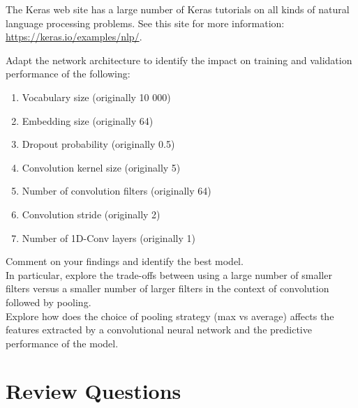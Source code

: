 \begin{resourcebox}
The Keras web site has a large number of Keras tutorials on all kinds of natural language processing problems. See this site for more information: \small\url{https://keras.io/examples/nlp/}\normalsize.
\end{resourcebox}


\begin{exercisebox}

Adapt the network architecture to identify the impact on training and validation performance of the following:
   \begin{enumerate}
      \item Vocabulary size (originally 10 000)
      \item Embedding size (originally 64)
      \item Dropout probability (originally 0.5)
      \item Convolution kernel size (originally 5)
      \item Number of convolution filters (originally 64)
      \item Convolution stride (originally 2)
      \item Number of 1D-Conv layers (originally 1)
   \end{enumerate} 
Comment on your findings and identify the best model.\\
   
In particular, explore the trade-offs between using a large number of smaller filters versus a smaller number of larger filters in the context of convolution followed by pooling. \\

Explore how does the choice of pooling strategy (max vs average) affects the features extracted by a convolutional neural network and the predictive performance of the model.\\
\end{exercisebox}


\section{Review Questions}
